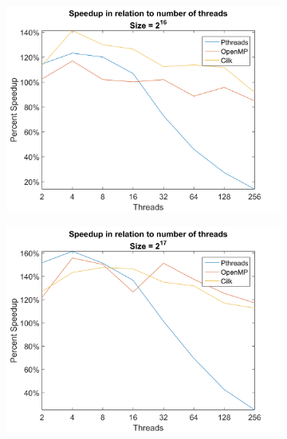 \documentclass[11pt,a4paper,titlepage]{article}
\begin{document}
		\begin{figure}[h!]
			\centering
			\begin{subfigure}[b]{0.45\textwidth}
			    \includegraphics[width=\textwidth]{figures/figure-3.1.png}
			    \caption{}
		    \end{subfigure}
			\begin{subfigure}[b]{0.45\textwidth}
				\includegraphics[width=\textwidth]{figures/figure-3.2.png}
				\caption{}
			\end{subfigure}
			\begin{subfigure}[b]{0.45\textwidth}

\end{subfigure}
\end{figure}
\end{document}
